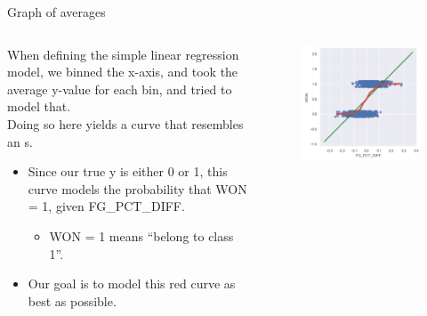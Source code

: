 \documentclass[aspectratio=169]{../latex_main/tntbeamer}  %
\begin{document}
	
		\begin{frame}{Graph of averages}
	    \begin{columns}
	        \begin{column}{.4\textwidth}
	                When defining the simple linear regression model, we binned the x-axis, and took the average y-value for each bin, and tried to model that.\\
	                \bigskip
	                Doing so here yields a curve that resembles an s.
	                \begin{itemize}
	                    \item Since our true y is either 0 or 1, this curve models the probability that WON = 1, given FG\_PCT\_DIFF.
	                    \begin{itemize}
	                        \item WON = 1 means “belong to class 1”.
	                    \end{itemize}
	                    \item Our goal is to model this red curve as best as possible.
	                \end{itemize}
	        \end{column}
	        
	        \begin{column}{.4\textwidth}
	                \begin{figure}
	                    \includegraphics[scale=.5]{Bild5}
	                \end{figure}
	        \end{column}
	    \end{columns}
	\end{frame}
	
\end{document}
